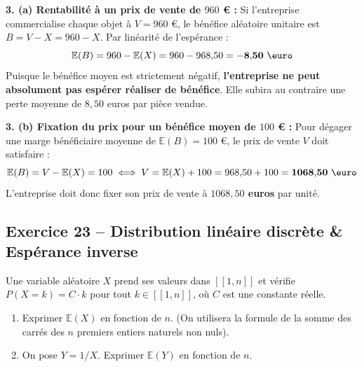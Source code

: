 \documentclass[11pt,a4paper]{article}
\newcommand{\E}{\mathbb{E}}
\begin{document}
\begin{correctionbox}
\textbf{3. (a) Rentabilité à un prix de vente de $960$ \euro{} :}
Si l'entreprise commercialise chaque objet à $V = 960$ \euro{}, le bénéfice aléatoire unitaire est $B = V - X = 960 - X$.
Par linéarité de l'espérance :
\[
\E(B) = 960 - \E(X) = 960 - 968{,}50 = \mathbf{-8{,}50\text{ \euro}}
\]
Puisque le bénéfice moyen est strictement négatif, \textbf{l'entreprise ne peut absolument pas espérer réaliser de bénéfice}. Elle subira au contraire une perte moyenne de $8{,}50$ euros par pièce vendue.

\textbf{3. (b) Fixation du prix pour un bénéfice moyen de $100$ \euro{} :}
Pour dégager une marge bénéficiaire moyenne de $\E(B) = 100$ \euro{}, le prix de vente $V$ doit satisfaire :
\[
\E(B) = V - \E(X) = 100 \iff V = \E(X) + 100 = 968{,}50 + 100 = \mathbf{1068{,}50\text{ \euro}}
\]
L'entreprise doit donc fixer son prix de vente à \textbf{$1068{,}50$ euros} par unité.
\end{correctionbox}

\vspace{0.3cm}

\subsection*{Exercice 23 -- Distribution linéaire discrète \& Espérance inverse}

Une variable aléatoire $X$ prend ses valeurs dans $[\![1, n]\!]$ et vérifie $P(X = k) = C \cdot k$ pour tout $k \in [\![1, n]\!]$, où $C$ est une constante réelle.
\begin{enumerate}[label=\arabic*.]
    \item Exprimer $\E(X)$ en fonction de $n$. (On utilisera la formule de la somme des carrés des $n$ premiers entiers naturels non nuls).
    \item On pose $Y = 1/X$. Exprimer $\E(Y)$ en fonction de $n$.
\end{enumerate}
\end{document}
